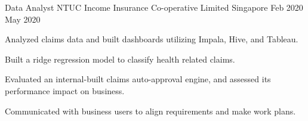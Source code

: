 

\begin{cventries}

  \cventry
    {Data Analyst} %
    {NTUC Income Insurance Co-operative Limited } %
    {Singapore} %
    {Feb 2020 \textemdash May 2020} %
    {
      \begin{cvitems} %
        \item {Analyzed claims data and built dashboards utilizing Impala, Hive, and Tableau.}
        \item {Built a ridge regression model to classify health related claims.}
        \item {Evaluated an internal-built claims auto-approval engine, and assessed its performance impact on business.}
        \item {Communicated with business users to align requirements and make work plans.}
      \end{cvitems}
    }

\end{cventries}
